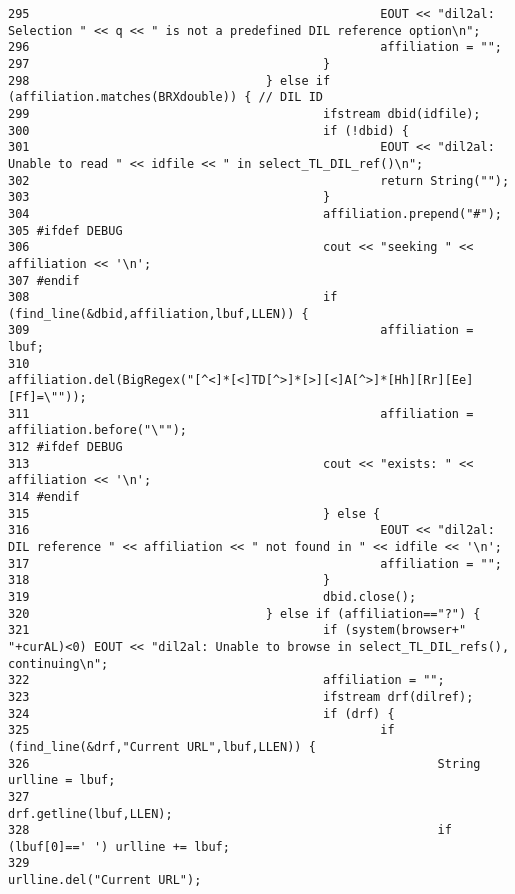 \begin{verbatim}
295                                                 EOUT << "dil2al: Selection " << q << " is not a predefined DIL reference option\n";
296                                                 affiliation = "";
297                                         }
298                                 } else if (affiliation.matches(BRXdouble)) { // DIL ID
299                                         ifstream dbid(idfile);
300                                         if (!dbid) {
301                                                 EOUT << "dil2al: Unable to read " << idfile << " in select_TL_DIL_ref()\n";
302                                                 return String("");
303                                         }
304                                         affiliation.prepend("#");
305 #ifdef DEBUG
306                                         cout << "seeking " << affiliation << '\n';
307 #endif
308                                         if (find_line(&dbid,affiliation,lbuf,LLEN)) {
309                                                 affiliation = lbuf;
310                                                 affiliation.del(BigRegex("[^<]*[<]TD[^>]*[>][<]A[^>]*[Hh][Rr][Ee][Ff]=\""));
311                                                 affiliation = affiliation.before("\"");
312 #ifdef DEBUG
313                                         cout << "exists: " << affiliation << '\n';
314 #endif
315                                         } else {
316                                                 EOUT << "dil2al: DIL reference " << affiliation << " not found in " << idfile << '\n';
317                                                 affiliation = "";
318                                         }
319                                         dbid.close();
320                                 } else if (affiliation=="?") {
321                                         if (system(browser+" "+curAL)<0) EOUT << "dil2al: Unable to browse in select_TL_DIL_refs(), continuing\n";
322                                         affiliation = "";
323                                         ifstream drf(dilref);
324                                         if (drf) {
325                                                 if (find_line(&drf,"Current URL",lbuf,LLEN)) {
326                                                         String urlline = lbuf;
327                                                         drf.getline(lbuf,LLEN);
328                                                         if (lbuf[0]==' ') urlline += lbuf;
329                                                         urlline.del("Current URL");

\end{verbatim}
